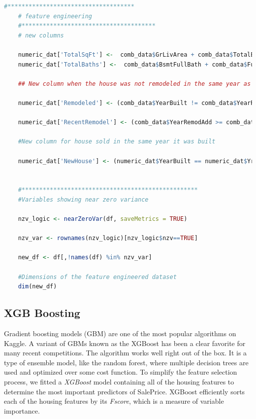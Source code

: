 \documentclass[sigconf]{acmart}
\begin{document}
	\begin{lstlisting}[language=R]
	#************************************
	# feature engineering
	#**************************************
	# new columns
	
	numeric_dat['TotalSqFt'] <-  comb_data$GrLivArea + comb_data$TotalBsmtSF
	numeric_dat['TotalBaths'] <-  comb_data$BsmtFullBath + comb_data$FullBath + (0.5 * (comb_data$BsmtHalfBath + comb_data$HalfBath))
	
	## New column when the house was not remodeled in the same year as built
	
	numeric_dat['Remodeled'] <- (comb_data$YearBuilt != comb_data$YearRemodAdd) * 1
	
	numeric_dat['RecentRemodel'] <- (comb_data$YearRemodAdd >= comb_data$YrSold) * 1
	
	#New column for house sold in the same year it was built
	
	numeric_dat['NewHouse'] <- (numeric_dat$YearBuilt == numeric_dat$YrSold) * 1
	
	
	#**************************************************
	#Variables showing near zero variance
	
	nzv_logic <- nearZeroVar(df, saveMetrics = TRUE)
	
	nzv_var <- rownames(nzv_logic)[nzv_logic$nzv==TRUE]
	
	new_df <- df[,!names(df) %in% nzv_var]
	
	#Dimensions of the feature engineered dataset
	dim(new_df)
	\end{lstlisting}
	
	
	
	\subsection{XGB Boosting}

	Gradient boosting models (GBM) are one of the most popular algorithms on Kaggle. A variant of GBMs known as the XGBoost has been a clear favorite for many recent competitions. The algorithm works well right out of the box. It is a type of ensemble model, like the random forest, where multiple decision trees are used and optimized over some cost function. To simplify the feature selection process, we fitted a {\em XGBoost} model containing all of the housing features to determine the most important predictors of SalePrice. XGBoost efficiently sorts each of the housing features by its {\em Fscore}, which is a measure of variable importance. 
	
\end{document}
